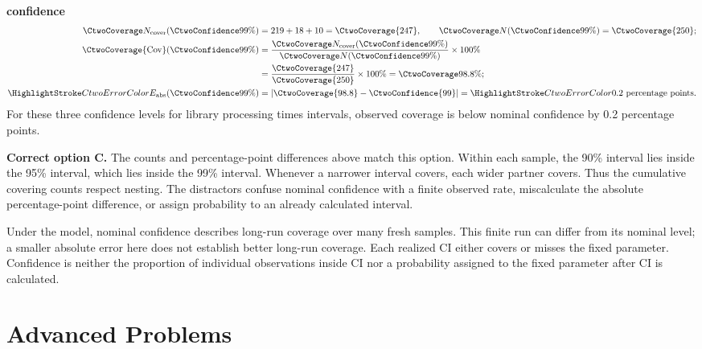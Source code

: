 \clearpage
\textbf{ confidence}\nopagebreak[4]
\begin{align*}
\CtwoCoverCount(\CtwoConfidence{99\%})&=219+18+10=\CtwoCoverage{247},
\qquad\CtwoTotalCount(\CtwoConfidence{99\%})=\CtwoCoverage{250};\\
\CtwoCoverage{\mathrm{Cov}}(\CtwoConfidence{99\%})
&=\frac{\CtwoCoverCount(\CtwoConfidence{99\%})}{\CtwoTotalCount(\CtwoConfidence{99\%})}\times100\%
\\
&=\frac{\CtwoCoverage{247}}{\CtwoCoverage{250}}\times100\%=\CtwoCoverage{98.8\%};\\
\CtwoError{E_{\rm abs}}(\CtwoConfidence{99\%})
&=\left|\CtwoCoverage{98.8}-\CtwoConfidence{99}\right|=\CtwoError{0.2}\ \text{percentage points}.
\end{align*}
For these three confidence levels for library processing times intervals, observed coverage is below nominal confidence by 0.2 percentage points.

\textbf{Correct option C.} The counts and percentage-point differences above match this option. Within each sample, the 90\% interval lies inside the 95\% interval, which lies inside the 99\% interval. Whenever a narrower interval covers, each wider partner covers. Thus the cumulative covering counts respect nesting. The distractors confuse nominal confidence with a finite observed rate, miscalculate the absolute percentage-point difference, or assign probability to an already calculated interval.

Under the model, nominal confidence describes long-run coverage over many fresh samples. This finite run can differ from its nominal level; a smaller absolute error here does not establish better long-run coverage. Each realized $\mathrm{CI}$ either covers or misses the fixed parameter. Confidence is neither the proportion of individual observations inside $\mathrm{CI}$ nor a probability assigned to the fixed parameter after $\mathrm{CI}$ is calculated.
\par\nopagebreak[4]
\par\vspace{3mm}
\clearpage
\section{Advanced Problems}
\label{sec:advanced}


